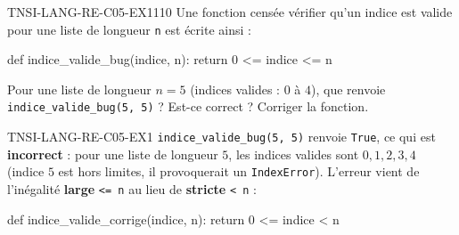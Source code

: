 
\begin{exercice}{TNSI-LANG-RE-C05-EX1}{1}{10}
Une fonction censée vérifier qu'un indice est valide pour une liste de longueur \lstinline{n} est écrite ainsi :
\begin{python}
def indice_valide_bug(indice, n):
    return 0 <= indice <= n
\end{python}
Pour une liste de longueur $n = 5$ (indices valides : $0$ à $4$), que renvoie \lstinline{indice_valide_bug(5, 5)} ? Est-ce correct ? Corriger la fonction.
\end{exercice}


\begin{corrige}{TNSI-LANG-RE-C05-EX1}
\lstinline{indice_valide_bug(5, 5)} renvoie \lstinline{True}, ce qui est \textbf{incorrect} : pour une liste de longueur $5$, les indices valides sont $0, 1, 2, 3, 4$ (indice $5$ est hors limites, il provoquerait un \lstinline{IndexError}). L'erreur vient de l'inégalité \textbf{large} \lstinline{<= n} au lieu de \textbf{stricte} \lstinline{< n} :
\begin{python}
def indice_valide_corrige(indice, n):
    return 0 <= indice < n
\end{python}
\end{corrige}
